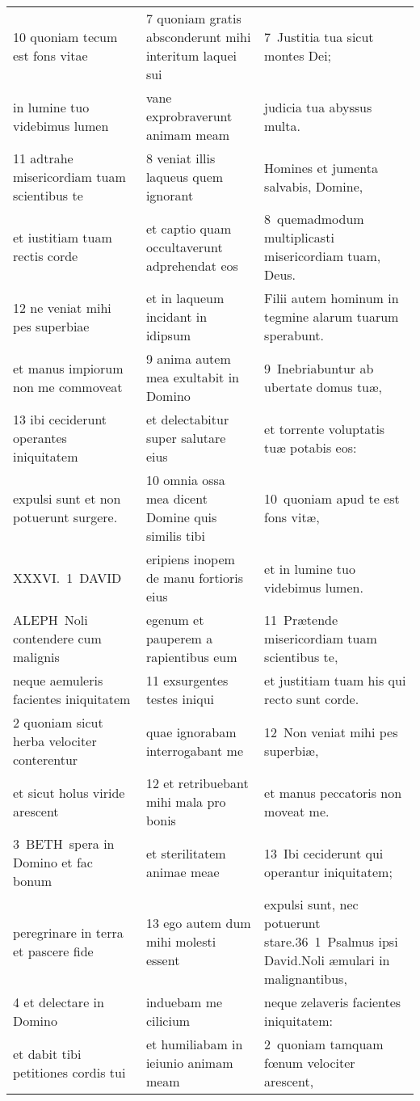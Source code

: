 \documentclass{article}
\begin{document}
\begin{longtable}{@{}p{}p{}p{}@{}}
10 quoniam tecum est fons vitae	&	7 quoniam gratis absconderunt mihi interitum laquei sui	&	7 Justitia tua sicut montes Dei;	\\
in lumine tuo videbimus lumen	&	vane exprobraverunt animam meam	&	judicia tua abyssus multa.	\\
11 adtrahe misericordiam tuam scientibus te	&	8 veniat illis laqueus quem ignorant	&	Homines et jumenta salvabis, Domine,	\\
et iustitiam tuam rectis corde	&	et captio quam occultaverunt adprehendat eos	&	8 quemadmodum multiplicasti misericordiam tuam, Deus.	\\
12 ne veniat mihi pes superbiae	&	et in laqueum incidant in idipsum	&	Filii autem hominum in tegmine alarum tuarum sperabunt.	\\
et manus impiorum non me commoveat	&	9 anima autem mea exultabit in Domino	&	9 Inebriabuntur ab ubertate domus tuæ,	\\
13 ibi ceciderunt operantes iniquitatem	&	et delectabitur super salutare eius	&	et torrente voluptatis tuæ potabis eos:	\\
expulsi sunt et non potuerunt surgere.	&	10 omnia ossa mea dicent Domine quis similis tibi	&	10 quoniam apud te est fons vitæ,	\\
XXXVI. 1 DAVID	&	eripiens inopem de manu fortioris eius	&	et in lumine tuo videbimus lumen.	\\
ALEPH Noli contendere cum malignis	&	egenum et pauperem a rapientibus eum	&	11 Prætende misericordiam tuam scientibus te,	\\
neque aemuleris facientes iniquitatem	&	11 exsurgentes testes iniqui	&	et justitiam tuam his qui recto sunt corde.	\\
2 quoniam sicut herba velociter conterentur	&	quae ignorabam interrogabant me	&	12 Non veniat mihi pes superbiæ,	\\
et sicut holus viride arescent	&	12 et retribuebant mihi mala pro bonis	&	et manus peccatoris non moveat me.	\\
3 BETH spera in Domino et fac bonum	&	et sterilitatem animae meae	&	13 Ibi ceciderunt qui operantur iniquitatem;	\\
peregrinare in terra et pascere fide	&	13 ego autem dum mihi molesti essent	&	expulsi sunt, nec potuerunt stare.36 1 Psalmus ipsi David.Noli æmulari in malignantibus,	\\
4 et delectare in Domino	&	induebam me cilicium	&	neque zelaveris facientes iniquitatem:	\\
et dabit tibi petitiones cordis tui	&	et humiliabam in ieiunio animam meam	&	2 quoniam tamquam fœnum velociter arescent,	\\

\end{longtable}
\end{document}
